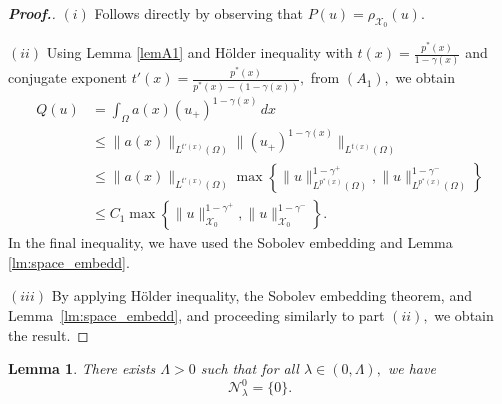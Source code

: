 \documentclass[11pt]{article}
\newtheorem{lemma}{Lemma}[section] %
\newcommand{\X}{\mathcal{X}_{0}}
\newcommand{\ga} {\gamma}
\newcommand{\om} {\Omega}
\begin{document}
\begin{proof}[\bf Proof.]
$(i)$ Follows directly by 
observing that $P(u) = \rho_{\X}(u)$.

$(ii)$
Using Lemma \ref{lemA1} and 
H\"older inequality with $t(x) = 
\frac{p^{*}(x)}{1 - \gamma(x)}$
and conjugate exponent $t'(x)=
\frac{p^*(x)}{p^*(x)-(1-\ga(x))},$
from $(A_1),$
we obtain
    \begin{align*}
        Q(u) &= 
\int_{\Omega} a(x)(u_+)^{1 - \gamma(x)}\,dx \\
&\leq \|a(x)\|_{L^{t'(x)}(\Omega)} 
\| (u_+)^{1 - \gamma(x)} \|_{L^{t(x)}(\Omega)} \\
&\leq \|a(x)\|_{L^{t'(x)}(\Omega)} 
\max \left\{ \|u\|_{L^{p^{*}(x)}
(\om)}^{1 - \gamma^+}, 
\|u\|_{L^{p^{*}(x)}(\om)}^{1 - \gamma^-}
 \right\} \\
&\leq C_1 \max 
\left\{ \|u\|_{\X}^{1 - \gamma^+}, 
\|u\|_{\X}^{1 - \gamma^-}
 \right\}.
    \end{align*}
    In the final inequality, we have used the Sobolev
     embedding and Lemma \ref{lm:space_embedd}.

$(iii)$
 By applying H\"older inequality, 
the Sobolev embedding theorem, and 
Lemma~\ref{lm:space_embedd}, and proceeding 
similarly to part $(ii),$
we obtain the result.\qedhere
\end{proof}

\begin{lemma} \label{lem:empty_nehari_0}
There exists $\Lambda > 0$
such that for all $\lambda \in (0, \Lambda),$
we have
\begin{equation*}
    \mathcal{N}_\lambda^0 = \{0\}.
\end{equation*}
\end{lemma}
\end{document}
